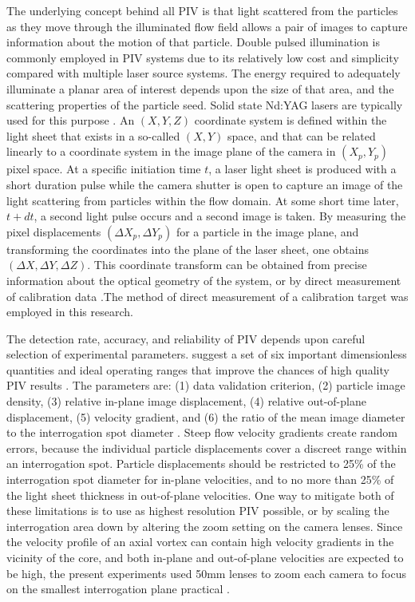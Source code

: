 The 
underlying concept behind all PIV is that light scattered from the particles as 
they move through the illuminated flow field allows a pair of images to capture 
information about the motion of that particle. Double pulsed illumination is 
commonly employed in PIV systems due to its relatively low cost and simplicity
compared with multiple laser source systems. The energy required to adequately 
illuminate a planar area of interest depends upon the size of that area, and 
the scattering properties of the particle seed. Solid state Nd:YAG lasers are 
typically used for this purpose \cite{adrian2011}. An $(X, Y, Z)$ coordinate 
system is defined within the light sheet that exists in a so-called $(X, Y)$ 
space, and that can be related linearly to a 
coordinate system in the image plane of the camera in $(X_p, Y_p)$ pixel space. 
At a specific initiation time $t$, a laser light sheet is produced with a short 
duration pulse while the camera shutter is open to 
capture an image of the light scattering from particles within the flow domain. 
At some short time later, $t + dt$, a second light pulse occurs and a second 
image is taken. By measuring the pixel displacements $(\Delta X_p, \Delta 
Y_p)$ for a particle in the image plane, and transforming the coordinates into 
the plane of the laser sheet, one obtains $(\Delta X, \Delta Y, \Delta Z)$. 
This coordinate transform can be obtained from precise information about the 
optical geometry of the system, or by direct measurement of calibration data 
\cite{fouras2007}.The method of direct measurement of a calibration target was 
employed in this research. 

The detection rate, accuracy, and reliability of PIV depends upon careful 
selection of experimental parameters. \cite{keane1990} suggest a set of six 
important dimensionless quantities and ideal operating ranges that improve the 
chances of high quality PIV results . The parameters 
are: (1) data validation criterion, (2) particle image density, (3) relative 
in-plane image displacement, (4) relative out-of-plane displacement, (5) 
velocity gradient, and (6) the ratio of the mean image diameter to the 
interrogation spot diameter \cite{keane1990,lawson1997b}. Steep flow velocity 
gradients create random errors, because the 
individual particle displacements cover a discreet range within an 
interrogation spot. Particle displacements should be restricted to 25\% of the 
interrogation spot diameter for in-plane velocities, and to no more than 25\% 
of the light 
sheet thickness in out-of-plane velocities. One way to mitigate both of these 
limitations is to use as highest resolution PIV possible, or by scaling the 
interrogation area down by altering the zoom setting on the camera lenses. 
Since the velocity profile of an axial vortex can contain high velocity 
gradients in the vicinity of the core, and both in-plane and out-of-plane 
velocities are expected to be high, the present experiments used 50mm lenses to 
zoom each camera to focus on the smallest interrogation plane practical
\cite{prasad1992}.


